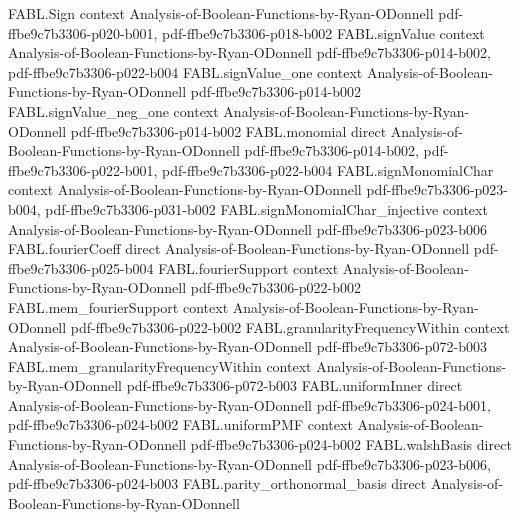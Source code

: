 \begin{theorem}
\label{FABL.noiseStability_const_neg_one}
\leanok
{}
\proofstep
  {FABL.Sign}
  {context}
  {Analysis-of-Boolean-Functions-by-Ryan-ODonnell}
  {pdf-ffbe9c7b3306-p020-b001,
    pdf-ffbe9c7b3306-p018-b002}
\proofstep
  {FABL.signValue}
  {context}
  {Analysis-of-Boolean-Functions-by-Ryan-ODonnell}
  {pdf-ffbe9c7b3306-p014-b002,
    pdf-ffbe9c7b3306-p022-b004}
\proofstep
  {FABL.signValue_one}
  {context}
  {Analysis-of-Boolean-Functions-by-Ryan-ODonnell}
  {pdf-ffbe9c7b3306-p014-b002}
\proofstep
  {FABL.signValue_neg_one}
  {context}
  {Analysis-of-Boolean-Functions-by-Ryan-ODonnell}
  {pdf-ffbe9c7b3306-p014-b002}
\proofstep
  {FABL.monomial}
  {direct}
  {Analysis-of-Boolean-Functions-by-Ryan-ODonnell}
  {pdf-ffbe9c7b3306-p014-b002,
    pdf-ffbe9c7b3306-p022-b001,
    pdf-ffbe9c7b3306-p022-b004}
\proofstep
  {FABL.signMonomialChar}
  {context}
  {Analysis-of-Boolean-Functions-by-Ryan-ODonnell}
  {pdf-ffbe9c7b3306-p023-b004,
    pdf-ffbe9c7b3306-p031-b002}
\proofstep
  {FABL.signMonomialChar_injective}
  {context}
  {Analysis-of-Boolean-Functions-by-Ryan-ODonnell}
  {pdf-ffbe9c7b3306-p023-b006}
\proofstep
  {FABL.fourierCoeff}
  {direct}
  {Analysis-of-Boolean-Functions-by-Ryan-ODonnell}
  {pdf-ffbe9c7b3306-p025-b004}
\proofstep
  {FABL.fourierSupport}
  {context}
  {Analysis-of-Boolean-Functions-by-Ryan-ODonnell}
  {pdf-ffbe9c7b3306-p022-b002}
\proofstep
  {FABL.mem_fourierSupport}
  {context}
  {Analysis-of-Boolean-Functions-by-Ryan-ODonnell}
  {pdf-ffbe9c7b3306-p022-b002}
\proofstep
  {FABL.granularityFrequencyWithin}
  {context}
  {Analysis-of-Boolean-Functions-by-Ryan-ODonnell}
  {pdf-ffbe9c7b3306-p072-b003}
\proofstep
  {FABL.mem_granularityFrequencyWithin}
  {context}
  {Analysis-of-Boolean-Functions-by-Ryan-ODonnell}
  {pdf-ffbe9c7b3306-p072-b003}
\proofstep
  {FABL.uniformInner}
  {direct}
  {Analysis-of-Boolean-Functions-by-Ryan-ODonnell}
  {pdf-ffbe9c7b3306-p024-b001,
    pdf-ffbe9c7b3306-p024-b002}
\proofstep
  {FABL.uniformPMF}
  {context}
  {Analysis-of-Boolean-Functions-by-Ryan-ODonnell}
  {pdf-ffbe9c7b3306-p024-b002}
\proofstep
  {FABL.walshBasis}
  {direct}
  {Analysis-of-Boolean-Functions-by-Ryan-ODonnell}
  {pdf-ffbe9c7b3306-p023-b006,
    pdf-ffbe9c7b3306-p024-b003}
\proofstep
  {FABL.parity_orthonormal_basis}
  {direct}
  {Analysis-of-Boolean-Functions-by-Ryan-ODonnell}

\end{theorem}
